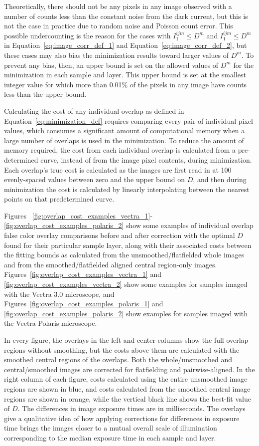 \documentclass[letterpaper,11pt]{article}
\newcommand{\refeq}[1]{Equation~\ref{#1}}
\begin{document}
Theoretically, there should not be any pixels in any image observed with a number of counts less than the constant noise from the dark current, but this is not the case in practice due to random noise and Poisson count error. This possible undercounting is the reason for the cases with $I^{ijm}_{1} \leq D^{m}$ and $I^{ijm}_{1} \leq D^{m}$ in \refeq{eq:image_corr_def_1} and \refeq{eq:image_corr_def_2}, but these cases may also bias the minimization results toward larger values of $D^{m}$. To prevent any bias, then, an upper bound is set on the allowed values of $D^{m}$ for the minimization in each sample and layer. This upper bound is set at the smallest integer value for which more than 0.01\% of the pixels in any image have counts less than the upper bound.

Calculating the cost of any individual overlap as defined in \refeq{eq:minimization_def} requires comparing every pair of individual pixel values, which consumes a significant amount of computational memory when a large number of overlaps is used in the minimization. To reduce the amount of memory required, the cost from each individual overlap is calculated from a pre-determined curve, instead of from the image pixel contents, during minimization. Each overlap's true cost is calculated as the images are first read in at 100 evenly-spaced values between zero and the upper bound on $D$, and then during minimization the cost is calculated by linearly interpolating between the nearest points on that predetermined curve. 

Figures ~\ref{fig:overlap_cost_examples_vectra_1}-\ref{fig:overlap_cost_examples_polaris_2} show some examples of individual overlap false color overlay comparisons before and after correction with the optimal $D$ found for their particular sample layer, along with their associated costs between the fitting bounds as calculated from the unsmoothed/flatfielded whole images and from the smoothed/flatfielded aligned central region-only images. Figures~\ref{fig:overlap_cost_examples_vectra_1} and \ref{fig:overlap_cost_examples_vectra_2} show some examples for samples imaged with the Vectra 3.0 microscope, and Figures~\ref{fig:overlap_cost_examples_polaris_1} and \ref{fig:overlap_cost_examples_polaris_2} show examples for samples imaged with the Vectra Polaris microscope. 

In every figure, the overlays in the left and center columns show the full overlap regions without smoothing, but the costs above them are calculated with the smoothed central regions of the overlaps. Both the whole/unsmoothed and central/smoothed images are corrected for flatfielding and pairwise-aligned. In the right column of each figure, costs calculated using the entire unsmoothed image regions are shown in blue, and costs calculated from the smoothed central image regions are shown in orange, while the vertical black line shows the best-fit value of $D$. The differences in image exposure times are in milliseconds. The overlays give a qualitative idea of how applying corrections for differences in exposure time brings the images closer to a mutual overall scale of illumination corresponding to the median exposure time in each sample and layer.
\end{document}
